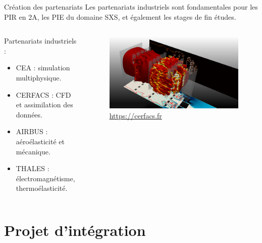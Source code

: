 \documentclass[aspectratio=169, french]{ISAE-Beamer}
\begin{document}
\begin{frame}{Création des partenariats}	
Les partenariats industriels sont fondamentales pour les PIR en 2A, les PIE du domaine SXS, et également les stages de fin études.


\begin{columns}
	\begin{column}{.5\textwidth}
	Partenariats industriels : 
	\begin{itemize}
		\item CEA : simulation multiphysique.
		\item CERFACS : CFD et assimilation des données. 
		\item AIRBUS : aéroélasticité et mécanique.
		\item THALES : électromagnétisme, thermoélasticité.
	\end{itemize}
	\end{column}
	\begin{column}{.43\textwidth}
	\begin{figure}
		\includegraphics[width=1\textwidth]{image_CERFACS.png}
		\caption{\href{https://cerfacs.fr/logiciels-de-simulation-pour-la-mecanique-des-fluides/}{https://cerfacs.fr}}
	\end{figure}	
	\end{column}
\end{columns}
	
\end{frame}

\section{Projet d'intégration}
\end{document}
